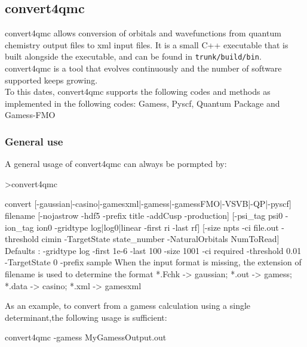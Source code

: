 \subsection{convert4qmc}
convert4qmc allows conversion of orbitals and wavefunctions from quantum chemistry output files to \qmcpack xml input files.  It is a small C++ executable that is built alongside the \qmcpack executable, and can be found in \texttt{trunk/build/bin}.\\
convert4qmc is a tool that evolves continuously and the number of software supported keeps growing.\\
To this dates, convert4qmc supports the following codes and methods as  implemented in the following codes: Gamess\cite{schmidt93}, Pyscf\cite{Sun2018}, Quantum Package\cite{QP} and Gamess-FMO\cite{Fedorov2004,schmidt93}


\subsubsection{General use}
A general usage of convert4qmc can always be pormpted  by:

\begin{shade}
>convert4qmc

 convert [-gaussian|-casino|-gamesxml|-gamess|-gamessFMO|-VSVB|-QP|-pyscf]
 filename                                                          
[-nojastrow -hdf5 -prefix title -addCusp -production]                                                                                           
[-psi_tag psi0 -ion_tag ion0 -gridtype log|log0|linear -first ri -last rf]
[-size npts -ci file.out -threshold cimin -TargetState state_number
-NaturalOrbitals NumToRead]                                        
Defaults : -gridtype log -first 1e-6 -last 100 -size 1001 -ci required 
-threshold 0.01 -TargetState 0 -prefix sample                                
When the input format is missing, the  extension of filename is used to determine
the format                                                      
 *.Fchk -> gaussian; *.out -> gamess; *.data -> casino; *.xml -> gamesxml
\end{shade}


As an example, to convert from a gamess calculation using a single determinant,the following usage is sufficient:\\
\begin{shade}
convert4qmc -gamess MyGamessOutput.out
\end{shade}


